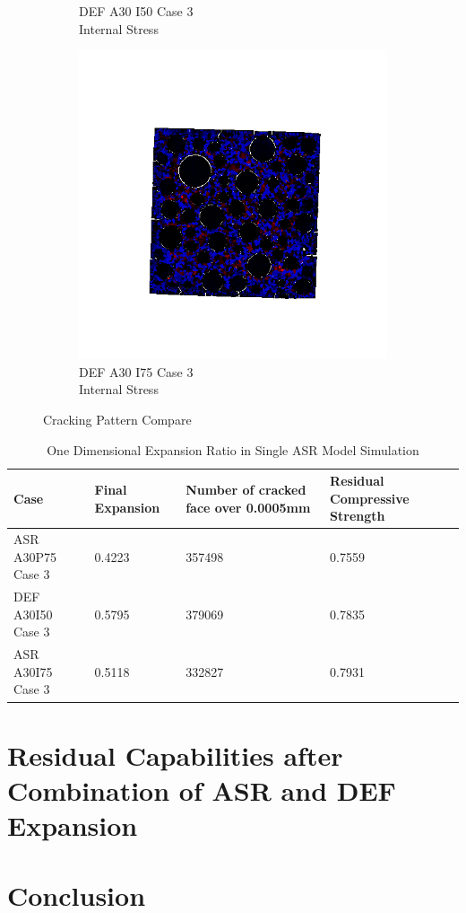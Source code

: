 \begin{figure}[ht]
\begin{subfigure}{.33\textwidth}
      \caption{DEF A30 I50 Case 3 \\ Internal Stress}
    \end{subfigure}%
    \begin{subfigure}{.33\textwidth}
      \centering
      \includegraphics[width=1.0\linewidth]{Files/exp_3D/DEF/A30X-5C_3_stress.png}
      \caption{DEF A30 I75 Case 3 \\ Internal Stress}
    \end{subfigure}
  \caption{Cracking Pattern Compare}
  \label{fig:ASR_A30P75_3_3D}
\end{figure}

\begin{table}[ht!]
\centering
\begin{tabular}{ |p{4cm}|p{2cm}|p{3cm}|p{3cm}| }
 \hline
 Case &  Final Expansion  & Number of cracked face over 0.0005mm & Residual Compressive Strength\\ [0.5ex]
 \hline
 ASR A30P75 Case 3 & 0.4223 & 357498 & 0.7559 \\ \hline
 DEF A30I50 Case 3 & 0.5795 & 379069 & 0.7835 \\ \hline
 ASR A30I75 Case 3 & 0.5118 & 332827 & 0.7931 \\
 \hline
\end{tabular}
\caption{One Dimensional Expansion Ratio in Single ASR Model Simulation}
\label{table:ASR_30_EXP}
\end{table}


\section{Residual Capabilities after Combination of ASR and DEF Expansion}

\section{Conclusion}
